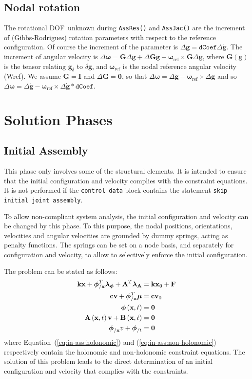\documentclass[10pt,dvips,fleqn,subeqn]{report}
\newcommand{\T}[1]{\bm{\mathbf{#1}}}
\newcommand{\dof}{DOF}
\begin{document}
\section{Nodal rotation}
The rotational \dof\ unknown during \texttt{AssRes()} and \texttt{AssJac()}
are the increment of (Gibbs-Rodrigues) rotation parameters
with respect to the reference configuration.
Of course the increment of the parameter is
$\Delta \T g=\texttt{dCoef}\Delta \dot{\T g}$.
The increment of angular velocity is 
$\Delta \T \omega = \T G\Delta \dot{\T g}+ \Delta \T G \dot{\T g}-
\T \omega_{\mathrm{ref}}\times \T G \Delta \T g$,
where $\T G(\T g)$ is the tensor relating $\T g_\delta$ to $\delta \T g$,
and $\T \omega_{\mathrm{ref}}$ is the nodal reference angular velocity (Wref).
We assume $\T G = \T I$ and $\Delta \T G = \T 0$,
so that $\Delta \T \omega = \Delta \dot{\T g}-\T \omega_{\mathrm{ref}}\times\Delta \T g$
and so $\Delta \T \omega = \Delta \dot{\T g}-
\T \omega_{\mathrm{ref}}\times\Delta \dot{\T g} * \texttt{dCoef}$.


\chapter{Solution Phases}
\section{Initial Assembly}
This phase only involves some of the structural elements.
It is intended to ensure that the initial configuration and velocity 
complies with the constraint equations.
It is not performed if the \texttt{control data} block contains 
the statement \texttt{skip initial joint assembly}.

To allow non-compliant system analysis, the initial configuration 
and velocity can be changed by this phase.
To this purpose, the nodal positions, orientations, velocities
and angular velocities are grounded by dummy springs, acting 
as penalty functions.
The springs can be set on a node basis, and separately 
for configuration and velocity, to allow to selectively enforce 
the initial configuration.

The problem can be stated as follows:
\begin{align}
	\T{k} \T{x} + \T{\phi}_{/\T{x}}^T \T{\lambda}_{\T{\phi}} + \T{A}^T \T{\lambda}_{\T{A}}
		& = \T{k} \T{x}_0 + \T{F} \\
	\T{c} \T{v} + \T{\phi}_{/\T{x}}^T \T{\mu} & = \T{c} \T{v}_0 \\
	\T{\phi}\plbr{\T{x}, t} & = \T{0} \label{eq:in-ass:holonomic} \\
	\T{A}\plbr{\T{x}, t} \T{v} + \T{B}\plbr{\T{x}, t} & = \T{0} \label{eq:in-ass:non-holonomic} \\
	\T{\phi}_{/\T{x}} v + \T{\phi}_{/t} & = \T{0}
\end{align}
where Equation~(\ref{eq:in-ass:holonomic}) and (\ref{eq:in-ass:non-holonomic})
respectively contain the holonomic and non-holonomic constraint equations.
The solution of this problem leads to the direct determination
of an initial configuration and velocity that complies 
with the constraints.
\end{document}

